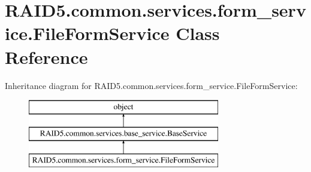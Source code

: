 \hypertarget{class_r_a_i_d5_1_1common_1_1services_1_1form__service_1_1_file_form_service}{}\section{R\+A\+I\+D5.\+common.\+services.\+form\+\_\+service.\+File\+Form\+Service Class Reference}
\label{class_r_a_i_d5_1_1common_1_1services_1_1form__service_1_1_file_form_service}
Inheritance diagram for R\+A\+I\+D5.\+common.\+services.\+form\+\_\+service.\+File\+Form\+Service\+:\begin{figure}[H]
\begin{center}
\leavevmode
\includegraphics[height=3.000000cm]{class_r_a_i_d5_1_1common_1_1services_1_1form__service_1_1_file_form_service}
\end{center}
\end{figure}
